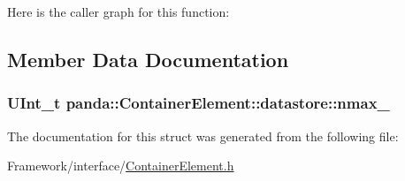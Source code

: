Here is the caller graph for this function\-:




\subsection{Member Data Documentation}
\hypertarget{structpanda_1_1ContainerElement_1_1datastore_abe908f5e2bbfd48f16f5ad4375021646}{
\subsubsection[{nmax\-\_\-}]{\setlength{\rightskip}{0pt plus 5cm}U\-Int\-\_\-t panda\-::\-Container\-Element\-::datastore\-::nmax\-\_\-\hspace{0.3cm}{\ttfamily [protected]}}}\label{structpanda_1_1ContainerElement_1_1datastore_abe908f5e2bbfd48f16f5ad4375021646}


The documentation for this struct was generated from the following file\-:\begin{DoxyCompactItemize}
\item 
Framework/interface/\hyperlink{ContainerElement_8h}{Container\-Element.\-h}\end{DoxyCompactItemize}
